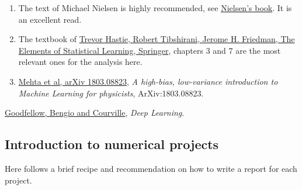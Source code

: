 \documentclass[%
oneside,                 %
final,                   %
10pt]{article}
\begin{document}
\begin{enumerate}
\item The text of Michael Nielsen is highly recommended, see \href{{http://neuralnetworksanddeeplearning.com/}}{Nielsen's book}. It is an excellent read.

\item The textbook of \href{{https://www.springer.com/gp/book/9780387848570}}{Trevor Hastie, Robert Tibshirani, Jerome H. Friedman, The Elements of Statistical Learning, Springer}, chapters 3 and 7 are the most relevant ones for the analysis here. 

\item \href{{https://arxiv.org/abs/1803.08823}}{Mehta et al, arXiv 1803.08823}, \emph{A high-bias, low-variance introduction to Machine Learning for physicists}, ArXiv:1803.08823.

\end{enumerate}

\noindent
\item \href{{https://www.deeplearningbook.org/}}{Goodfellow, Bengio and Courville}, \emph{Deep Learning}.

\subsection{Introduction to numerical projects}

Here follows a brief recipe and recommendation on how to write a report for each
project.
\end{document}
